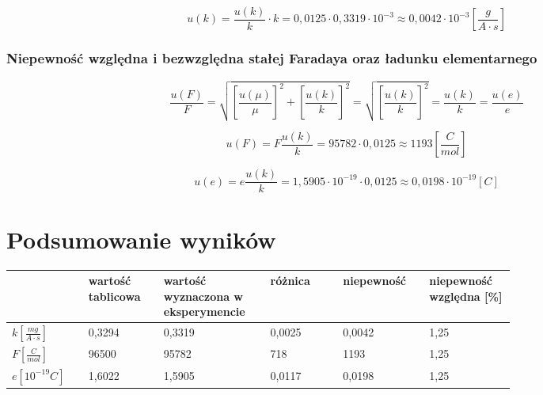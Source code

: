 \documentclass [a4paper,11pt]{article}
\begin{document}
\begin{equation*}
u(k) = \frac{u(k)}{k} \cdot k =  0,0125 \cdot 0,3319 \cdot 10^{-3} \approx 0,0042 \cdot 10^{-3}  \left[  \frac{g}{A \cdot s}\right] 
\end{equation*}

\subsubsection*{Niepewność względna i bezwzględna  stałej Faradaya oraz ładunku elementarnego}

\begin{equation*}
\frac{u(F)}{F} = \sqrt{\left[\frac{u(\mu)}{\mu} \right]^2 + \left[\frac{u(k)}{k} \right]^2 } = \sqrt{\left[\frac{u(k)}{k} \right]^2 } = \frac{u(k)}{k}  =   \frac{u(e)}{e}
\end{equation*}

\begin{equation*}
u(F) = F \frac{u(k)}{k}  =  95782  \cdot  0,0125 \approx 1193  \left[  \frac{C}{mol}\right] 
\end{equation*}

\begin{equation*}
u(e) = e \frac{u(k)}{k}  =  1,5905 \cdot 10^{-19}  \cdot  0,0125 \approx 0,0198 \cdot 10^{-19} [C] 
\end{equation*}

\section{Podsumowanie wyników}



\begin{tabular}{|C{0.12\linewidth}|C{0.12\linewidth}|C{0.14\linewidth}|C{0.12\linewidth}|C{0.12\linewidth}|C{0.12\linewidth}|}
\hline  & wartość tablicowa  & wartość wyznaczona w eksperymencie & różnica & niepewność  & niepewność względna [\%]  \\ 
\hline $k \left[  \frac{mg}{A \cdot s}\right]$ & 0,3294  & 0,3319  & 0,0025  & 0,0042  & 1,25  \\ 
\hline $F \left[  \frac{C}{mol}\right]$ & 96500 & 95782  & 718  & 1193  & 1,25  \\ 
\hline $e [10^{-19} C]$ & 1,6022   & 1,5905    & 0,0117    & 0,0198   & 1,25  \\ 
\hline 
\end{tabular} 
\end{document}
